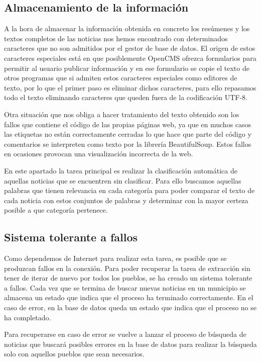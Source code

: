 \subsection{Almacenamiento de la información}

A la hora de almacenar la información obtenida en concreto los resúmenes y los textos completos de las noticias nos hemos encontrado con determinados caracteres que no son admitidos por el gestor de base de datos. El origen de estos caracteres especiales está en que posiblemente OpenCMS ofrezca formularios para permitir al usuario publicar información y en ese formulario se copie el texto de otros programas que si admiten estos caracteres especiales como editores de texto, por lo que el primer paso es eliminar dichos caracteres, para ello repasamos todo el texto eliminando caracteres que queden fuera de la codificación UTF-8. 

Otra situación que nos obliga a hacer tratamiento del texto obtenido son los fallos que contiene el código de las propias páginas web, ya que en muchos casos las etiquetas no están correctamente cerradas lo que hace que parte del código y comentarios se interpreten como texto por la librería BeautifulSoup. Estos fallos en ocasiones provocan una visualización incorrecta de la web.

En este apartado la tarea principal es realizar la clasificación automática de aquellas noticias que se encuentren sin clasificar. Para ello buscamos aquellas palabras que tienen relevancia en cada categoría para poder comparar el texto de cada noticia con estos conjuntos de palabras y determinar con la mayor certeza posible a que categoría pertenece.



\subsection{Sistema tolerante a fallos}

Como dependemos de Internet para realizar esta tarea, es posible que se produzcan fallos en la conexión. Para poder recuperar la tarea de extracción sin tener de iterar de nuevo por todos los pueblos, se ha creado un sistema tolerante a fallos. Cada vez que se termina de buscar nuevas noticias en un municipio se almacena un estado que indica que el proceso ha terminado correctamente. En el caso de error, en la base de datos queda un estado que indica que el proceso no se ha completado.

Para recuperarse en caso de error se vuelve a lanzar el proceso de búsqueda de noticias que buscará posibles errores en la base de datos para realizar la búsqueda solo con aquellos pueblos que sean necesarios.

